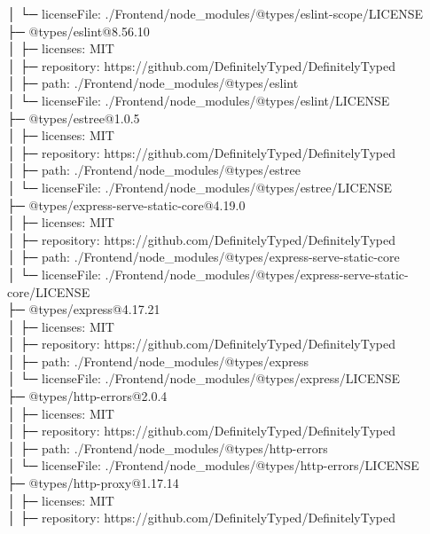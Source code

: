 │  └─ licenseFile: ./Frontend/node\_modules/@types/eslint-scope/LICENSE\\
├─ @types/eslint@8.56.10\\
│  ├─ licenses: MIT\\
│  ├─ repository: https://github.com/DefinitelyTyped/DefinitelyTyped\\
│  ├─ path: ./Frontend/node\_modules/@types/eslint\\
│  └─ licenseFile: ./Frontend/node\_modules/@types/eslint/LICENSE\\
├─ @types/estree@1.0.5\\
│  ├─ licenses: MIT\\
│  ├─ repository: https://github.com/DefinitelyTyped/DefinitelyTyped\\
│  ├─ path: ./Frontend/node\_modules/@types/estree\\
│  └─ licenseFile: ./Frontend/node\_modules/@types/estree/LICENSE\\
├─ @types/express-serve-static-core@4.19.0\\
│  ├─ licenses: MIT\\
│  ├─ repository: https://github.com/DefinitelyTyped/DefinitelyTyped\\
│  ├─ path: ./Frontend/node\_modules/@types/express-serve-static-core\\
│  └─ licenseFile: ./Frontend/node\_modules/@types/express-serve-static-core/LICENSE\\
├─ @types/express@4.17.21\\
│  ├─ licenses: MIT\\
│  ├─ repository: https://github.com/DefinitelyTyped/DefinitelyTyped\\
│  ├─ path: ./Frontend/node\_modules/@types/express\\
│  └─ licenseFile: ./Frontend/node\_modules/@types/express/LICENSE\\
├─ @types/http-errors@2.0.4\\
│  ├─ licenses: MIT\\
│  ├─ repository: https://github.com/DefinitelyTyped/DefinitelyTyped\\
│  ├─ path: ./Frontend/node\_modules/@types/http-errors\\
│  └─ licenseFile: ./Frontend/node\_modules/@types/http-errors/LICENSE\\
├─ @types/http-proxy@1.17.14\\
│  ├─ licenses: MIT\\
│  ├─ repository: https://github.com/DefinitelyTyped/DefinitelyTyped\\
